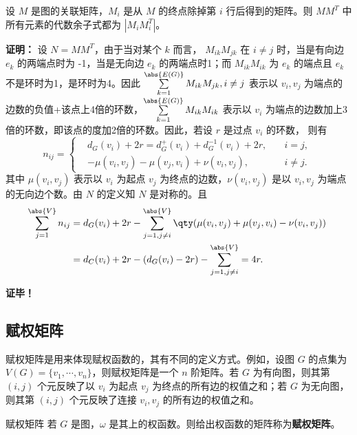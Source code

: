 \begin{theorem}{}
设 $M$ 是图的关联矩阵，$M_i$ 是从 $M$ 的终点除掉第 $i$ 行后得到的矩阵。则 $MM^T$ 中所有元素的代数余子式都为 $|M_iM_i^T|$。

\end{theorem}
\textbf{证明：}
设 $N=MM^T$，由于当对某个 $k$ 而言， $M_{ik}M_{jk}$ 在 $i\neq j$ 时，当是有向边 $e_k$ 的两端点时为 -1，当是无向边 $e_k$ 的两端点时1；而 $M_{ik}M_{ik}$ 为 $e_k$ 的端点且 $e_k$ 不是环时为1，是环时为4。因此 $\sum\limits_{k=1}^{\abs{E(G)}}M_{ik}M_{jk},i\neq j$ 表示以 $v_i,v_j$ 为端点的边数的负值+该点上4倍的环数，$\sum\limits_{k=1}^{\abs{E(G)}}M_{ik}M_{ik}$ 表示以 $v_i$ 为端点的边数加上3倍的环数，即该点的度加2倍的环数。因此，若设 $r$ 是过点 $v_i$ 的环数， 则有
\begin{equation}
n_{ij}=\left\{\begin{aligned}
&d_G(v_i)+2r=d_G^+(v_i)+d_G^{-1}(v_i)+2r,\quad &i=j,\\
&-\mu(v_i,v_j)-\mu(v_j,v_i)+\nu(v_i,v_j),\quad &i\neq j.
\end{aligned}\right.~
\end{equation}
其中 $\mu(v_i,v_j)$ 表示以 $v_i$ 为起点 $v_j$ 为终点的边数，$\nu(v_i,v_j)$ 是以 $v_i,v_j$ 为端点的无向边个数。由 $N$ 的定义知 $N$ 是对称的。且 
\begin{equation}
\begin{aligned}
\sum_{j=1}^{\abs{V}}n_{ij}&=d_G(v_i)+2r-\sum_{j=1,j\neq i}^{\abs{V}}\qty(\mu(v_i,v_j)+\mu(v_j,v_i)-\nu(v_i,v_j))\\
&=d_C(v_i)+2r-(d_G(v_i)-2r)-\sum_{j=1,j\neq i}^{\abs{V}}=4r.
\end{aligned}
~
\end{equation}



\textbf{证毕！}


\subsection{赋权矩阵}

赋权矩阵是用来体现赋权函数的，其有不同的定义方式。例如，设图 $G$ 的点集为 $V(G)=\{v_1,\cdots,v_n\}$，则赋权矩阵是一个 $n$ 阶矩阵。若 $G$ 为有向图，则其第 $(i,j)$ 个元反映了以 $v_i$ 为起点 $v_j$ 为终点的所有边的权值之和；若 $G$ 为无向图，则其第 $(i,j)$ 个元反映了连接 $v_i,v_j$ 的所有边的权值之和。
\begin{definition}{赋权矩阵}
若 $G$ 是图，$\omega$ 是其上的权函数。则给出权函数的矩阵称为\textbf{赋权矩阵}。
\end{definition}









